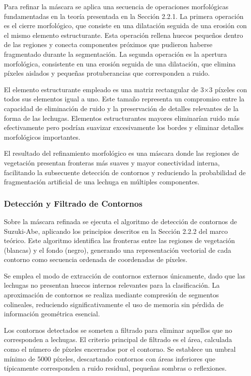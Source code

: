 Para refinar la máscara se aplica una secuencia de operaciones morfológicas fundamentadas en la teoría presentada en la Sección 2.2.1. La primera operación es el cierre morfológico, que consiste en una dilatación seguida de una erosión con el mismo elemento estructurante. Esta operación rellena huecos pequeños dentro de las regiones y conecta componentes próximos que pudieron haberse fragmentado durante la segmentación. La segunda operación es la apertura morfológica, consistente en una erosión seguida de una dilatación, que elimina píxeles aislados y pequeñas protuberancias que corresponden a ruido.

El elemento estructurante empleado es una matriz rectangular de 3×3 píxeles con todos sus elementos igual a uno. Este tamaño representa un compromiso entre la capacidad de eliminación de ruido y la preservación de detalles relevantes de la forma de las lechugas. Elementos estructurantes mayores eliminarían ruido más efectivamente pero podrían suavizar excesivamente los bordes y eliminar detalles morfológicos importantes.

El resultado del refinamiento morfológico es una máscara donde las regiones de vegetación presentan fronteras más suaves y mayor conectividad interna, facilitando la subsecuente detección de contornos y reduciendo la probabilidad de fragmentación artificial de una lechuga en múltiples componentes.

\subsubsection{Detección y Filtrado de Contornos}

Sobre la máscara refinada se ejecuta el algoritmo de detección de contornos de Suzuki-Abe, aplicando los principios descritos en la Sección 2.2.2 del marco teórico. Este algoritmo identifica las fronteras entre las regiones de vegetación (blancas) y el fondo (negro), generando una representación vectorial de cada contorno como secuencia ordenada de coordenadas de píxeles.

Se emplea el modo de extracción de contornos externos únicamente, dado que las lechugas no presentan huecos internos relevantes para la clasificación. La aproximación de contornos se realiza mediante compresión de segmentos colineales, reduciendo significativamente el uso de memoria sin pérdida de información geométrica esencial.

Los contornos detectados se someten a filtrado para eliminar aquellos que no corresponden a lechugas. El criterio principal de filtrado es el área, calculada como el número de píxeles encerrados por el contorno. Se establece un umbral mínimo de 5000 píxeles, descartando contornos con áreas inferiores que típicamente corresponden a ruido residual, pequeñas sombras o reflexiones.

